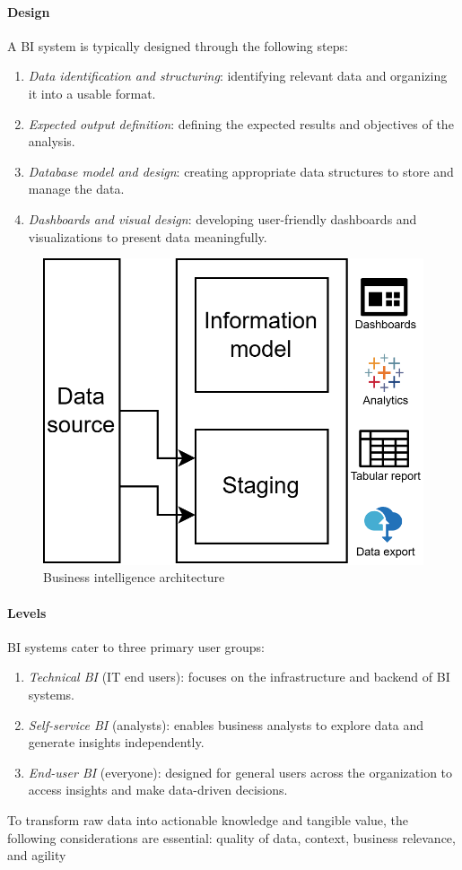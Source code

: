 \paragraph*{Design}
A BI system is typically designed through the following steps:
\begin{enumerate}
    \item \textit{Data identification and structuring}: identifying relevant data and organizing it into a usable format.
    \item \textit{Expected output definition}: defining the expected results and objectives of the analysis.
    \item \textit{Database model and design}: creating appropriate data structures to store and manage the data.
    \item \textit{Dashboards and visual design}: developing user-friendly dashboards and visualizations to present data meaningfully.
\end{enumerate}

\begin{figure}[H]
    \centering
    \includegraphics[width=0.5\linewidth]{images/bis6.png}
    \caption{Business intelligence architecture}
\end{figure}

\paragraph*{Levels}
BI systems cater to three primary user groups:
\begin{enumerate}
    \item \textit{Technical BI} (IT end users): focuses on the infrastructure and backend of BI systems.
    \item \textit{Self-service BI} (analysts): enables business analysts to explore data and generate insights independently.
    \item \textit{End-user BI} (everyone): designed for general users across the organization to access insights and make data-driven decisions.
\end{enumerate}
\noindent To transform raw data into actionable knowledge and tangible value, the following considerations are essential: quality of data, context, business relevance, and agility

